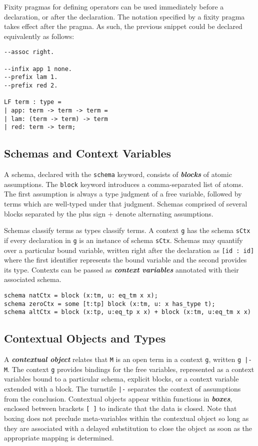 \documentclass[11pt]{article}
\begin{document}
Fixity pragmas for defining operators can be used immediately before a declaration, or after the declaration.
The notation specified by a fixity pragma takes effect after the pragma.
As such, the previous snippet could be declared equivalently as follows:
\begin{verbatim}
--assoc right.

--infix app 1 none.
--prefix lam 1.
--prefix red 2.

LF term : type =
| app: term -> term -> term =
| lam: (term -> term) -> term
| red: term -> term;
\end{verbatim}

\subsection{Schemas and Context Variables}
A schema, declared with the \verb+schema+ keyword, consists of \textbf{\textit{blocks}} of atomic assumptions.
The \verb+block+ keyword introduces a comma-separated list of atoms.
The first assumption is always a type judgment of a free variable, followed by terms which are well-typed under that judgment.
Schemas comprised of several blocks separated by the plus sign \verb+++ denote alternating assumptions.

Schemas classify terms as types classify terms.
A context \verb+g+ has the schema \verb+sCtx+ if every declaration in \verb+g+ is an instance of schema \verb+sCtx+.
Schemas may quantify over a particular bound variable, written right after the declaration as \verb+[id : id]+ where the first identifier represents the bound variable and the second provides its type.
Contexts can be passed as \textit{\textbf{context variables}} annotated with their associated schema.

\begin{verbatim}
schema natCtx = block (x:tm, u: eq_tm x x);
schema zeroCtx = some [t:tp] block (x:tm, u: x has_type t);
schema altCtx = block (x:tp, u:eq_tp x x) + block (x:tm, u:eq_tm x x)
\end{verbatim}


\subsection{Contextual Objects and Types}
A \textit{\textbf{contextual object}} relates that \verb+M+ is an open term in a context \verb+g+, written \verb+g |- M+.
The context \verb+g+ provides bindings for the free variables, represented as a context variables bound to a particular schema, explicit blocks, or a context variable extended with a block.
The turnstile \verb+|-+ separates the context of assumptions from the conclusion.
Contextual objects appear within functions in \textit{\textbf{boxes}}, enclosed between brackets \verb+[ ]+ to indicate that the data is closed.
Note that boxing does not preclude meta-variables within the contextual object so long as they are associated with a delayed substitution to close the object as soon as the appropriate mapping is determined.
\end{document}
